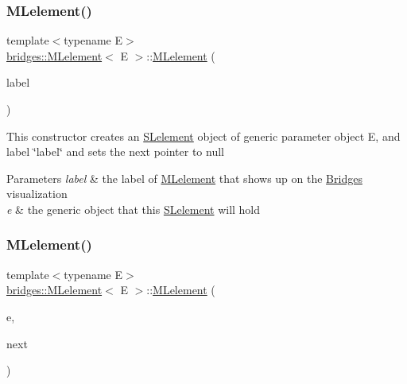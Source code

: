 \subsubsection{\texorpdfstring{M\+Lelement()}{MLelement()}\hspace{0.1cm}{\footnotesize\ttfamily [2/3]}}
{\footnotesize\ttfamily template$<$typename E$>$ \\
\mbox{\hyperlink{classbridges_1_1_m_lelement}{bridges\+::\+M\+Lelement}}$<$ E $>$\+::\mbox{\hyperlink{classbridges_1_1_m_lelement}{M\+Lelement}} (\begin{DoxyParamCaption}\item[{string}]{label }\end{DoxyParamCaption})\hspace{0.3cm}{\ttfamily [inline]}}

This constructor creates an \mbox{\hyperlink{classbridges_1_1_s_lelement}{S\+Lelement}} object of generic parameter object E, and label \char`\"{}label\char`\"{} and sets the next pointer to null


\begin{DoxyParams}{Parameters}
{\em label} & the label of \mbox{\hyperlink{classbridges_1_1_m_lelement}{M\+Lelement}} that shows up on the \mbox{\hyperlink{namespacebridges_1_1_bridges}{Bridges}} visualization \\
\hline
{\em e} & the generic object that this \mbox{\hyperlink{classbridges_1_1_s_lelement}{S\+Lelement}} will hold \\
\hline
\end{DoxyParams}
\mbox{\label{classbridges_1_1_m_lelement_aaab4924754f94138bb110efd4c047411}} 
\subsubsection{\texorpdfstring{M\+Lelement()}{MLelement()}\hspace{0.1cm}{\footnotesize\ttfamily [3/3]}}
{\footnotesize\ttfamily template$<$typename E$>$ \\
\mbox{\hyperlink{classbridges_1_1_m_lelement}{bridges\+::\+M\+Lelement}}$<$ E $>$\+::\mbox{\hyperlink{classbridges_1_1_m_lelement}{M\+Lelement}} (\begin{DoxyParamCaption}\item[{E}]{e,  }\item[{\mbox{\hyperlink{classbridges_1_1_m_lelement}{M\+Lelement}}$<$ E $>$ $\ast$}]{next }\end{DoxyParamCaption})\hspace{0.3cm}{\ttfamily [inline]}}

